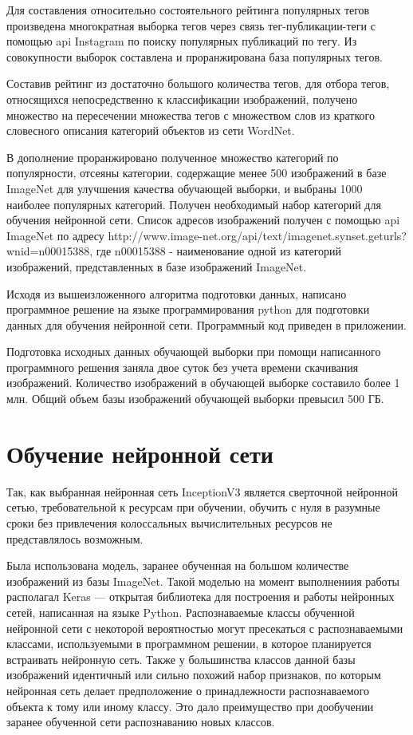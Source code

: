Для составления относительно состоятельного рейтинга популярных тегов произведена многократная выборка тегов через связь тег-публикации-теги с помощью api Instagram по поиску популярных публикаций по тегу. 
Из совокупности выборок составлена и проранжирована база популярных тегов.

Составив рейтинг из достаточно большого количества тегов, для отбора тегов, относящихся непосредственно к классификации изображений, получено множество на пересечении множества тегов с множеством слов из краткого словесного описания категорий объектов из сети WordNet. 

В дополнение проранжировано полученное множество категорий по популярности, отсеяны категории, содержащие менее 500 изображений в базе ImageNet для улучшения качества обучающей выборки, и выбраны 1000 наиболее популярных категорий. 
Получен необходимый набор категорий для обучения нейронной сети. 
Список адресов изображений получен с помощью api ImageNet по адресу http://www.image-net.org/api/text/imagenet.synset.geturls?wnid=n00015388, где n00015388 - наименование одной из категорий изображений, представленных в базе изображений ImageNet.

Исходя из вышеизложенного алгоритма подготовки данных, написано программное решение на языке программирования python для подготовки данных для обучения нейронной сети. Программный код приведен в приложении.

Подготовка исходных данных обучающей выборки при помощи написанного программного решения заняла двое суток без учета времени скачивания изображений. 
Количество изображений в обучающей выборке составило более 1 млн. 
Общий объем базы изображений обучающей выборки превысил 500 ГБ.

\section{Обучение нейронной сети}

Так, как выбранная нейронная сеть InceptionV3 является сверточной нейронной сетью, требовательной к ресурсам при обучении, обучить с нуля в разумные сроки без привлечения колоссальных вычислительных ресурсов не представлялось возможным.

Была использована модель, заранее обученная на большом количестве изображений из базы ImageNet. 
Такой моделью на момент выполнениия работы располагал Keras — открытая библиотека для построения и работы нейронных сетей, написанная на языке Python. 
Распознаваемые классы обученной нейронной сети с некоторой вероятностью могут пресекаться с распознаваемыми классами, используемыми в программном решении, в которое планируется встраивать нейронную сеть. 
Также у большинства классов данной базы изображений идентичный или сильно похожий набор признаков, по которым нейронная сеть делает предположение о принадлежности распознаваемого объекта к тому или иному классу. 
Это дало преимущество при дообучении заранее обученной сети распознаванию новых классов.

